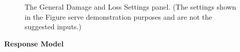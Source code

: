 \begin{figure}[!htbp]
  \caption{The General Damage and Loss Settings panel. (The settings shown in the Figure serve demonstration purposes and are not the suggested inputs.)}
  \label{fig:dl_hazus_general}
\end{figure}

\textbf{Response Model}

